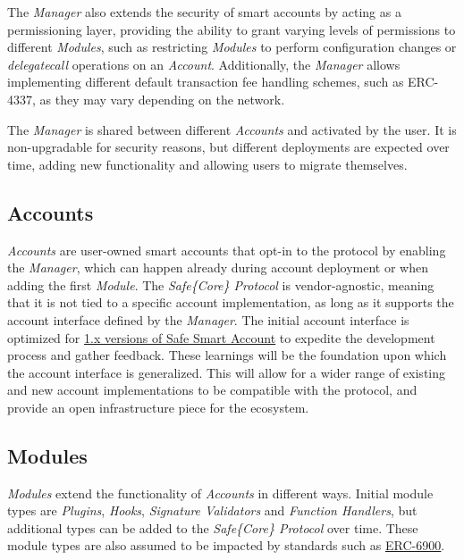 \documentclass[
]{article}
\begin{document}
The \emph{Manager} also extends the security of smart accounts by acting as a permissioning layer, providing the ability to grant varying levels of permissions to different \emph{Modules}, such as restricting \emph{Modules} to perform configuration changes or \emph{delegatecall} operations on an \emph{Account}. Additionally, the \emph{Manager} allows implementing different default transaction fee handling schemes, such as ERC-4337, as they may vary depending on the network.

The \emph{Manager} is shared between different \emph{Accounts} and activated by the user. It is non-upgradable for security reasons, but different deployments are expected over time, adding new functionality and allowing users to migrate themselves.

\hypertarget{accounts}{%
  \subsection{Accounts}\label{accounts}}

\emph{Accounts} are user-owned smart accounts that opt-in to the protocol by enabling the \emph{Manager}, which can happen already during account deployment or when adding the first \emph{Module}. The \emph{Safe\{Core\} Protocol} is vendor-agnostic, meaning that it is not tied to a specific account implementation, as long as it supports the account interface defined by the \emph{Manager}. The initial account interface is optimized for \href{https://github.com/safe-global/safe-contracts/releases}{\uline{1.x versions of Safe Smart Account}} to expedite the development process and gather feedback. These learnings will be the foundation upon which the account interface is generalized. This will allow for a wider range of existing and new account implementations to be compatible with the protocol, and provide an open infrastructure piece for the ecosystem.

\hypertarget{modules}{%
  \subsection{Modules}\label{modules}}

\emph{Modules} extend the functionality of \emph{Accounts} in different ways. Initial module types are \emph{Plugins}, \emph{Hooks}, \emph{Signature Validators} and \emph{Function Handlers}, but additional types can be added to the \emph{Safe\{Core\} Protocol} over time. These module types are also assumed to be impacted by standards such as \href{https://eips.ethereum.org/EIPS/eip-6900}{\uline{ERC-6900}}.
\end{document}
